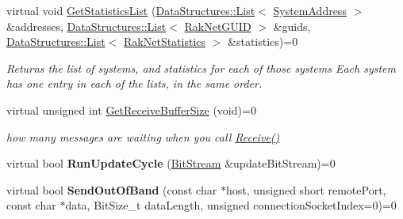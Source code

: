 \begin{DoxyCompactItemize}
virtual void \hyperlink{class_rak_net_1_1_rak_peer_interface_ad474ee839667fb5e1b667ea5465dc021}{Get\-Statistics\-List} (\hyperlink{class_data_structures_1_1_list}{Data\-Structures\-::\-List}$<$ \hyperlink{struct_rak_net_1_1_system_address}{System\-Address} $>$ \&addresses, \hyperlink{class_data_structures_1_1_list}{Data\-Structures\-::\-List}$<$ \hyperlink{struct_rak_net_1_1_rak_net_g_u_i_d}{Rak\-Net\-G\-U\-I\-D} $>$ \&guids, \hyperlink{class_data_structures_1_1_list}{Data\-Structures\-::\-List}$<$ \hyperlink{struct_rak_net_1_1_rak_net_statistics}{Rak\-Net\-Statistics} $>$ \&statistics)=0
\begin{DoxyCompactList}\small\item\em Returns the list of systems, and statistics for each of those systems Each system has one entry in each of the lists, in the same order. \end{DoxyCompactList}\item 
\hypertarget{class_rak_net_1_1_rak_peer_interface_a8f0971a8d45efdf1ce30946195195736}{virtual unsigned int \hyperlink{class_rak_net_1_1_rak_peer_interface_a8f0971a8d45efdf1ce30946195195736}{Get\-Receive\-Buffer\-Size} (void)=0}\label{class_rak_net_1_1_rak_peer_interface_a8f0971a8d45efdf1ce30946195195736}

\begin{DoxyCompactList}\small\item\em how many messages are waiting when you call \hyperlink{class_rak_net_1_1_rak_peer_interface_a1c50453d9dee600920aeabd62ad7c119}{Receive()} \end{DoxyCompactList}\item 
\hypertarget{class_rak_net_1_1_rak_peer_interface_a51c048b8877dbff0e4f8eb4dd23473f2}{virtual bool {\bfseries Run\-Update\-Cycle} (\hyperlink{class_rak_net_1_1_bit_stream}{Bit\-Stream} \&update\-Bit\-Stream)=0}\label{class_rak_net_1_1_rak_peer_interface_a51c048b8877dbff0e4f8eb4dd23473f2}

\item 
\hypertarget{class_rak_net_1_1_rak_peer_interface_a536be26af99299220806a74434c58853}{virtual bool {\bfseries Send\-Out\-Of\-Band} (const char $\ast$host, unsigned short remote\-Port, const char $\ast$data, Bit\-Size\-\_\-t data\-Length, unsigned connection\-Socket\-Index=0)=0}\label{class_rak_net_1_1_rak_peer_interface_a536be26af99299220806a74434c58853}

\end{DoxyCompactItemize}
